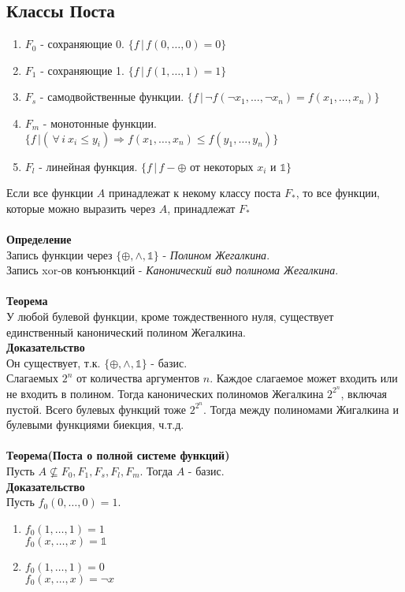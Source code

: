 \documentclass[12pt]{article}
\begin{document}
\subsection{Классы Поста}
\begin{enumerate}
    \item $F_0$ - сохраняющие 0. $\{f\,|\,f(0,\ldots,0) = 0\}$
    \item $F_1$ - сохраняющие 1. $\{f\,|\,f(1,\ldots,1) = 1\}$
    \item $F_s$ - самодвойственные функции. $\{f\,|\,\lnot f(\lnot x_1,\ldots,\lnot x_n) = f(x_1,\ldots,x_n)\}$
    \item $F_m$ - монотонные функции. $\{f\,|(\,\forall\,i\ x_i \leq y_i )\Rightarrow f(x_1,\ldots, x_n) \leq f(y_1,\ldots, y_n)\}$
    \item $F_l$ - линейная функция. $\{ f\,|\, f - \oplus$ от некоторых $x_i$ и $\mathbb{1} \}$
\end{enumerate}
Если все функции $A$ принадлежат к некому классу поста $F_*$, то все функции, которые можно выразить через $A$, принадлежат $F_*$\\\\
\textbf{Определение}\\
Запись функции через $\{\oplus,\land,\mathbb{1}\}$ - \textit{Полином Жегалкина}.\\
Запись xor-ов конъюнкций - \textit{Канонический вид полинома Жегалкина}.\\\\
\textbf{Теорема}\\
У любой булевой функции, кроме тождественного нуля, существует единственный канонический полином Жегалкина.\\
\textbf{Доказательство}\\
Он существует, т.к. $\{\oplus,\land,\mathbb{1}\}$ - базис.\\
Слагаемых $2^n$ от количества аргументов $n$. Каждое слагаемое может входить или не входить в полином. Тогда канонических полиномов Жегалкина $2^{2^n}$, включая пустой. Всего булевых функций тоже $2^{2^n}$. Тогда между полиномами Жигалкина и булевыми функциями  биекция, ч.т.д.\\\\
\textbf{Теорема(Поста о полной системе функций)}\\
Пусть $A \nsubseteq F_0,F_1,F_s,F_l,F_m$. Тогда $A$ - базис.\\
\textbf{Доказательство}\\
Пусть $f_0(0,\ldots,0) = 1$.
\begin{enumerate}
    \item $f_0(1,\ldots,1) = 1$\\
    $f_0(x,\ldots,x) = \mathbb{1}$
    \item $f_0(1,\ldots,1) = 0$\\
    $f_0(x,\ldots,x) = \lnot x$
\end{enumerate}
\end{document}
